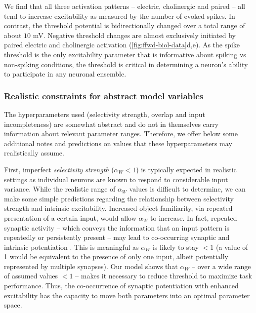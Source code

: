We find that all three activation patterns
        -- electric, cholinergic and paired --
        all tend to increase excitability as measured by the number of evoked spikes.
    In contrast, the threshold potential is bidirectionally changed over a total range of about $10$ mV.
    Negative threshold changes are almost exclusively initiated
        by paired electric and cholinergic activation (\autoref{fig:ffwd-biol-data}d,e).
    As the spike threshold is the only excitability parameter
        that is informative about spiking vs non-spiking conditions,
        the threshold is critical in determining a neuron's ability to participate in any neuronal ensemble.


\subsubsection*{Realistic constraints for abstract model variables}

The hyperparameters used
        (selectivity strength, overlap and input incompleteness)
        are somewhat abstract
        and do not in themselves carry information about relevant parameter ranges.
    Therefore, we offer below some additional notes
        and predictions on values that these hyperparameters may realistically assume.

First, imperfect \textit{selectivity strength} ($\alpha_W < 1$)
        is typically expected in realistic settings
        as individual neurons are known to respond to considerable input variance.
    While the realistic range of $\alpha_W$ values is difficult to determine,
        we can make some simple predictions regarding the relationship between
            selectivity strength and intrinsic excitability.
    Increased object familiarity,
        via repeated presentation of a certain input,
        would allow $\alpha_W$ to increase.
    In fact, repeated synaptic activity
        -- which conveys the information that an input pattern is repeatedly or persistently present --
        may lead to co-occurring synaptic and intrinsic potentiation \citep[e.g.][]{Belmeguenai2010-ee}.
    This is meaningful as $\alpha_W$ is likely to stay $ < 1$
        (a value of 1 would be equivalent to the presence of only one input,
        albeit potentially represented by multiple synapses).
    Our model shows that $\alpha_W$ -- over a wide range of assumed values $ < 1$ --
        makes it necessary to reduce threshold to maximize task performance.
    Thus, the co-occurrence of synaptic potentiation with enhanced excitability has the capacity
        to move both parameters into an optimal parameter space.

